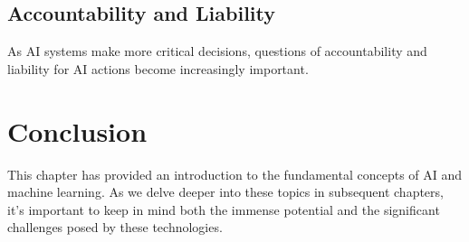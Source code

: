\subsection{Accountability and Liability}

As AI systems make more critical decisions, questions of accountability
and liability for AI actions become increasingly important.

\section{Conclusion}

This chapter has provided an introduction to the fundamental concepts of
AI and machine learning. As we delve deeper into these topics in
subsequent chapters, it's important to keep in mind both the immense
potential and the significant challenges posed by these technologies.


